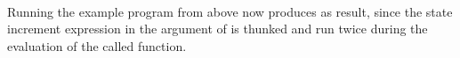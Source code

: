 \begin{code}[hide]
%
\>[8]\AgdaSpace{}%
\AgdaSpace{}%
\AgdaSpace{}%
\AgdaSpace{}%
\AgdaSymbol{=}\AgdaSpace{}%
\<%
\\
%
\>[8]\AgdaSpace{}%
\AgdaSpace{}%
\AgdaSpace{}%
\AgdaSpace{}%
\AgdaSymbol{=}\AgdaSpace{}%
\<%
\\
%
\>[8]\AgdaSpace{}%
\AgdaSpace{}%
\AgdaSpace{}%
\AgdaSpace{}%
\AgdaSymbol{=}\AgdaSpace{}%
\<%
\\
%
\\[\AgdaEmptyExtraSkip]%
%
\>[6]\AgdaSpace{}%
\AgdaModule{\AgdaUnderscore{}}\AgdaSpace{}%
\<%
\\
\>[6][@{}l@{\AgdaIndent{0}}]%
\>[8]\AgdaSpace{}%
\AgdaSpace{}%
\AgdaSpace{}%
\AgdaSymbol{:}\AgdaSpace{}%
\AgdaSpace{}%
\AgdaSpace{}%
\AgdaSymbol{(}\AgdaSpace{}%
\AgdaSpace{}%
\AgdaSymbol{)}\<%
\\
%
\>[8]\AgdaSpace{}%
\AgdaSymbol{=}\AgdaSpace{}%
\<%
\end{code}
%
Running the example program  from above now produces  as result, since the state increment expression in the argument of  is thunked and run twice during the evaluation of the called function.
%
